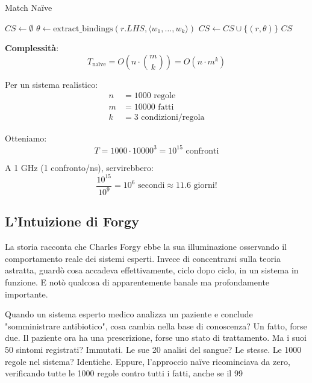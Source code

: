 \begin{algorithm}[H]
\caption{Match Naïve}
\begin{algorithmic}[1]
    \State $CS \gets \emptyset$
                \State $\theta \gets \text{extract\_bindings}(r.LHS, \langle w_1, \ldots, w_k \rangle)$
                \State $CS \gets CS \cup \{(r, \theta)\}$
            \EndIf
        \EndFor
    \EndFor
    \State \Return $CS$
\EndFunction
\end{algorithmic}
\end{algorithm}

\textbf{Complessità}:
\begin{equation}
T_{\text{naïve}} = O\left(n \cdot \binom{m}{k}\right) = O(n \cdot m^k)
\end{equation}

\begin{esempio}
Per un sistema realistico:
\begin{align*}
n &= 1000 \text{ regole}\\
m &= 10000 \text{ fatti}\\
k &= 3 \text{ condizioni/regola}
\end{align*}

Otteniamo:
\begin{equation}
T = 1000 \cdot 10000^3 = 10^{15} \text{ confronti}
\end{equation}

A 1 GHz (1 confronto/ns), servirebbero:
\begin{equation}
\frac{10^{15}}{10^9} = 10^6 \text{ secondi} \approx 11.6 \text{ giorni!}
\end{equation}
\end{esempio}

\subsection{L'Intuizione di Forgy}

La storia racconta che Charles Forgy ebbe la sua illuminazione osservando il comportamento reale dei sistemi esperti. Invece di concentrarsi sulla teoria astratta, guardò cosa accadeva effettivamente, ciclo dopo ciclo, in un sistema in funzione. E notò qualcosa di apparentemente banale ma profondamente importante.

Quando un sistema esperto medico analizza un paziente e conclude "somministrare antibiotico", cosa cambia nella base di conoscenza? Un fatto, forse due. Il paziente ora ha una prescrizione, forse uno stato di trattamento. Ma i suoi 50 sintomi registrati? Immutati. Le sue 20 analisi del sangue? Le stesse. Le 1000 regole nel sistema? Identiche. Eppure, l'approccio naïve ricominciava da zero, verificando tutte le 1000 regole contro tutti i fatti, anche se il 99%


